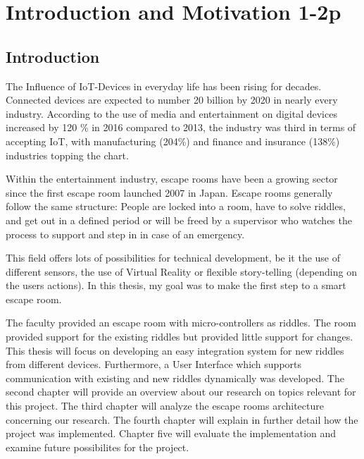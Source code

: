
\chapter{Introduction and Motivation 1-2p} %

\label{Chapter1} %


\section{Introduction}

The Influence of IoT-Devices in everyday life has been rising for decades.
Connected devices are expected to number 20 billion \parencite{gartner0} by 2020 in nearly every industry.
According to \parencite{verizon} the use of media and entertainment on digital devices increased by 120 \% in 2016 compared to 2013,
the industry was third in terms of accepting IoT,
with manufacturing (204\%) and finance and insurance (138\%) industries topping the chart.

Within the entertainment industry, escape rooms have been a growing sector since the first escape room launched 2007 in Japan.
Escape rooms generally follow the same structure: People are locked into a room, have to solve riddles,
and get out in a defined period or will be freed by a supervisor who watches the process to support
and step in in case of an emergency.

This field offers lots of possibilities for technical development, be it the use of different sensors, the use of Virtual Reality or flexible story-telling (depending on the users actions).
In this thesis, my goal was to make the first step to a smart escape room.

The faculty provided an escape room with micro-controllers as riddles.
The room provided support for the existing riddles but provided little support for changes.
This thesis will focus on developing an easy integration system for new riddles from different devices.
Furthermore, a User Interface which supports communication with existing and new riddles dynamically was developed.
The second chapter will provide an overview about our research on topics relevant for this project. 
The third chapter will analyze the escape rooms architecture concerning our research. 
The fourth chapter will explain in further detail how the project was implemented. 
Chapter five will evaluate the implementation and examine future possibilites for the project.

